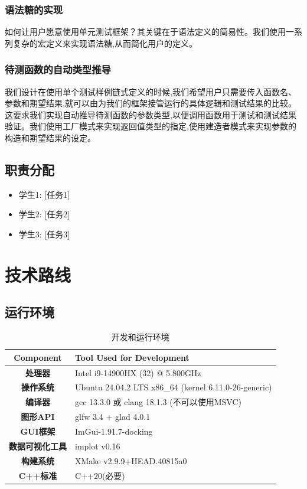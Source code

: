 \documentclass{article}
\begin{document}
\subsubsection{语法糖的实现}
如何让用户愿意使用单元测试框架？其关键在于语法定义的简易性。我们使用一系列复杂的宏定义来实现语法糖,从而简化用户的定义。
\subsubsection{待测函数的自动类型推导}
我们设计在使用单个测试样例链式定义的时候,我们希望用户只需要传入函数名、参数和期望结果,就可以由为我们的框架接管运行的具体逻辑和测试结果的比较。
这要求我们实现自动推导待测函数的参数类型,以便调用函数用于测试和测试结果验证。我们使用工厂模式来实现返回值类型的指定,使用建造者模式来实现参数的构造和期望结果的设定。
\subsection{ 职责分配}
\begin{itemize}[leftmargin=*]
    \item 学生1: [任务1]
    \item 学生2: [任务2]
    \item 学生3: [任务3]
\end{itemize}

\section{技术路线}
\subsection{运行环境}
\begin{table}[H]
    \centering
    \caption{开发和运行环境}
    \begin{tabular}{@{}>{\bfseries}c>{\raggedright\arraybackslash}p{10cm}@{}} %
        \toprule
        \textbf{Component} & \textbf{Tool Used for Development}                    \\
        \midrule
        处理器                & Intel i9-14900HX (32) @ 5.800GHz                      \\
        操作系统               & Ubuntu 24.04.2 LTS x86\_64 (kernel 6.11.0-26-generic) \\
        编译器                & gcc 13.3.0 或 clang 18.1.3 (不可以使用MSVC)                 \\
        图形API              & glfw 3.4 + glad 4.0.1                                 \\
        GUI框架              & ImGui-1.91.7-docking                                  \\
        数据可视化工具            & implot v0.16                                          \\
        构建系统               & XMake v2.9.9+HEAD.40815a0                             \\
        C++标准              & C++20(必要)                                             \\
        \bottomrule
    \end{tabular}
\end{table}
\end{document}
